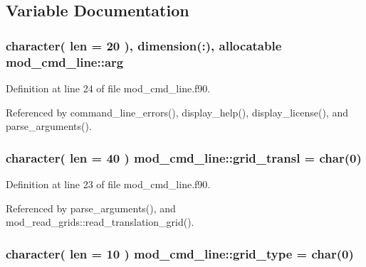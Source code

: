 \subsection{Variable Documentation}
\subsubsection[{\texorpdfstring{arg}{arg}}]{\setlength{\rightskip}{0pt plus 5cm}character( len = 20 ), dimension(\+:), allocatable mod\+\_\+cmd\+\_\+line\+::arg}\hypertarget{namespacemod__cmd__line_a39002195e12526c3d97ff7ee81f9c00c}{}\label{namespacemod__cmd__line_a39002195e12526c3d97ff7ee81f9c00c}


Definition at line 24 of file mod\+\_\+cmd\+\_\+line.\+f90.



Referenced by command\+\_\+line\+\_\+errors(), display\+\_\+help(), display\+\_\+license(), and parse\+\_\+arguments().

\subsubsection[{\texorpdfstring{grid\+\_\+transl}{grid_transl}}]{\setlength{\rightskip}{0pt plus 5cm}character( len = 40 ) mod\+\_\+cmd\+\_\+line\+::grid\+\_\+transl = char(0)}\hypertarget{namespacemod__cmd__line_aa1ebd20914c6804b19cef6f2f1f5b8b9}{}\label{namespacemod__cmd__line_aa1ebd20914c6804b19cef6f2f1f5b8b9}


Definition at line 23 of file mod\+\_\+cmd\+\_\+line.\+f90.



Referenced by parse\+\_\+arguments(), and mod\+\_\+read\+\_\+grids\+::read\+\_\+translation\+\_\+grid().

\subsubsection[{\texorpdfstring{grid\+\_\+type}{grid_type}}]{\setlength{\rightskip}{0pt plus 5cm}character( len = 10 ) mod\+\_\+cmd\+\_\+line\+::grid\+\_\+type = char(0)}\hypertarget{namespacemod__cmd__line_ad92694e0caab203d3bc911dabb059271}{}\label{namespacemod__cmd__line_ad92694e0caab203d3bc911dabb059271}


